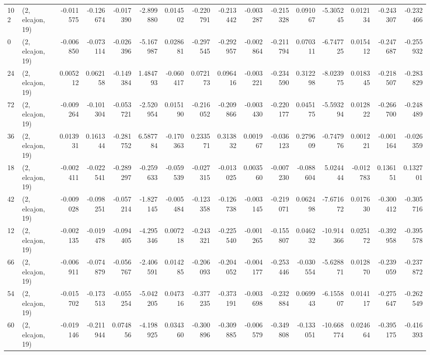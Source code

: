 \begin{tabular}{llrrrrrrrrrrrrrr}
102 &  (2, elcajon, 19) &  -0.011575 & -0.126674 & -0.017390 &   -2.899880 &  0.014502 &  -0.220791 & -0.213442 & -0.003287 & -0.215328 &  0.091067 &   -5.305245 &  0.012134 & -0.243307 & -0.232466 \\
0   &  (2, elcajon, 19) &  -0.006850 & -0.073114 & -0.026396 &   -5.167987 &  0.028681 &  -0.297545 & -0.292957 & -0.002864 & -0.211794 &  0.070311 &   -6.747725 &  0.015412 & -0.247687 & -0.255932 \\
24  &  (2, elcajon, 19) &   0.005212 &  0.062158 & -0.149384 &    1.484793 & -0.060417 &   0.072173 &  0.096416 & -0.003221 & -0.234590 &  0.312298 &   -8.023975 &  0.018345 & -0.218507 & -0.283829 \\
72  &  (2, elcajon, 19) &  -0.009264 & -0.101304 & -0.053721 &   -2.520954 &  0.015190 &  -0.216052 & -0.209866 & -0.003430 & -0.220177 &  0.045175 &   -5.593294 &  0.012822 & -0.266700 & -0.248489 \\
36  &  (2, elcajon, 19) &   0.013931 &  0.161344 & -0.281752 &    6.587784 & -0.170363 &   0.233571 &  0.313832 &  0.001967 & -0.036123 &  0.279609 &   -0.747976 &  0.001221 & -0.001164 & -0.026359 \\
18  &  (2, elcajon, 19) &  -0.002411 & -0.022541 & -0.289297 &   -0.259633 & -0.059539 &  -0.027315 & -0.013025 &  0.003560 & -0.007230 & -0.088604 &    5.024444 & -0.012783 &  0.136151 &  0.132701 \\
42  &  (2, elcajon, 19) &  -0.009028 & -0.098251 & -0.057214 &   -1.827145 & -0.005484 &  -0.123358 & -0.126738 & -0.003145 & -0.219071 &  0.062498 &   -7.671672 &  0.017630 & -0.300412 & -0.305716 \\
12  &  (2, elcajon, 19) &  -0.002135 & -0.019478 & -0.094405 &   -4.295346 &  0.007218 &  -0.243321 & -0.225540 & -0.001265 & -0.155807 &  0.046232 &  -10.914366 &  0.025172 & -0.392958 & -0.395578 \\
66  &  (2, elcajon, 19) &  -0.006911 & -0.074879 & -0.056767 &   -2.406591 &  0.014285 &  -0.206093 & -0.204052 & -0.004177 & -0.253446 & -0.030554 &   -5.628871 &  0.012870 & -0.239059 & -0.237872 \\
54  &  (2, elcajon, 19) &  -0.015702 & -0.173513 & -0.055254 &   -5.042205 &  0.047316 &  -0.377235 & -0.373191 & -0.003698 & -0.232884 &  0.069943 &   -6.155807 &  0.014117 & -0.275647 & -0.262549 \\
60  &  (2, elcajon, 19) &  -0.019146 & -0.211944 &  0.074856 &   -4.198925 &  0.034360 &  -0.300896 & -0.309885 & -0.006579 & -0.349808 & -0.133051 &  -10.668774 &  0.024664 & -0.395175 & -0.416393 \\

\end{tabular}
